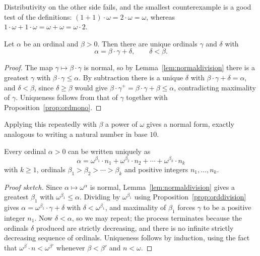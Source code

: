 Distributivity on the other side fails, and the smallest counterexample is a good test of the definitions: $(1 + 1)\cdot \omega = 2 \cdot \omega = \omega$, whereas $1 \cdot \omega + 1 \cdot \omega = \omega + \omega = \omega \cdot 2$.

\begin{proposition}\label{prop:orddivision}
  Let $\alpha$ be an ordinal and $\beta > 0$. Then there are unique ordinals $\gamma$ and $\delta$ with
  $$\alpha = \beta \cdot \gamma + \delta, \qquad \delta < \beta.$$
\end{proposition}
\begin{proof}
  The map $\gamma \mapsto \beta\cdot\gamma$ is normal, so by Lemma~\ref{lem:normaldivision} there is a greatest $\gamma$ with $\beta\cdot\gamma \leq \alpha$. By subtraction there is a unique $\delta$ with $\beta\cdot\gamma + \delta = \alpha$, and $\delta < \beta$, since $\delta \geq \beta$ would give $\beta\cdot\gamma^+ = \beta\cdot\gamma + \beta \leq \alpha$, contradicting maximality of $\gamma$. Uniqueness follows from that of $\gamma$ together with Proposition~\ref{prop:ordmono}.
\end{proof}

Applying this repeatedly with $\beta$ a power of $\omega$ gives a normal form, exactly analogous to writing a natural number in base $10$.

\begin{theorem}
  Every ordinal $\alpha > 0$ can be written uniquely as
  $$\alpha = \omega^{\beta_1}\cdot n_1 + \omega^{\beta_2}\cdot n_2 + \cdots + \omega^{\beta_k}\cdot n_k$$
  with $k \geq 1$, ordinals $\beta_1 > \beta_2 > \cdots > \beta_k$ and positive integers $n_1, \dots, n_k$.
\end{theorem}
\begin{proof}[Proof sketch]
  Since $\alpha \mapsto \omega^\alpha$ is normal, Lemma~\ref{lem:normaldivision} gives a greatest $\beta_1$ with $\omega^{\beta_1} \leq \alpha$. Dividing by $\omega^{\beta_1}$ using Proposition~\ref{prop:orddivision} gives $\alpha = \omega^{\beta_1}\cdot \gamma + \delta$ with $\delta < \omega^{\beta_1}$, and maximality of $\beta_1$ forces $\gamma$ to be a positive integer $n_1$. Now $\delta < \alpha$, so we may repeat; the process terminates because the ordinals $\delta$ produced are strictly decreasing, and there is no infinite strictly decreasing sequence of ordinals. Uniqueness follows by induction, using the fact that $\omega^{\beta}\cdot n < \omega^{\beta'}$ whenever $\beta < \beta'$ and $n < \omega$.
\end{proof}


